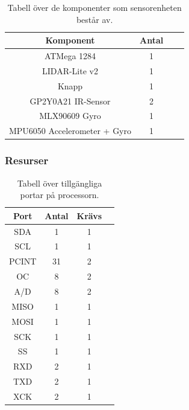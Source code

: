 \documentclass{article}
\begin{document}
\begin{table}[H]
  \centering
  \begin{tabular}{ | c | c | c | c |}
    \hline
    \textbf{Komponent} & \textbf{Antal} \\
    \hline
    ATMega 1284 & 1 \\
    \hline
    LIDAR-Lite v2 & 1 \\
    \hline
    Knapp & 1 \\
    \hline
    GP2Y0A21 IR-Sensor & 2 \\
    \hline
    MLX90609 Gyro & 1 \\
    \hline
    MPU6050 Accelerometer + Gyro & 1 \\
    \hline
  \end{tabular}
  \caption{ Tabell över de komponenter som sensorenheten består av. }
\end{table}

\subsubsection{Resurser}

\begin{table}[H]
  \centering
  \begin{tabular}{ | c | c | c | c |}
    \hline
    \textbf{Port} & \textbf{Antal} & \textbf{Krävs} \\
    \hline
    SDA & 1 & 1 \\
    \hline
    SCL & 1 & 1 \\
    \hline
    PCINT & 31 & 2 \\
    \hline
    OC & 8 & 2 \\
    \hline
    A/D & 8 & 2 \\
    \hline
    MISO & 1 & 1 \\
    \hline
    MOSI & 1 & 1 \\
    \hline
    SCK & 1 & 1 \\
    \hline
    SS & 1 & 1 \\
    \hline
    RXD & 2 & 1 \\
    \hline
    TXD & 2 & 1 \\
    \hline
    XCK & 2 & 1 \\
    \hline
  \end{tabular}
  \caption{Tabell över tillgängliga portar på processorn.}
\end{table}
\end{document}
